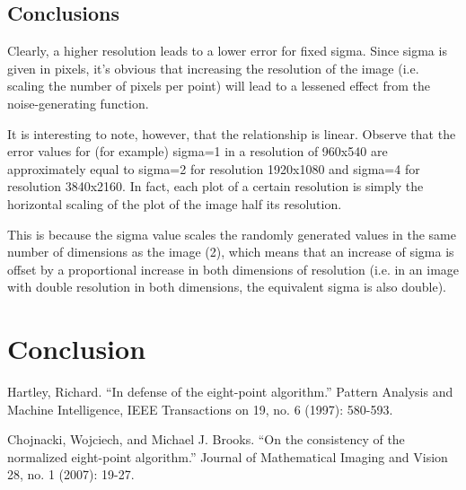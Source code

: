 \documentclass{article}
\begin{document}
\subsection{Conclusions}


Clearly, a higher resolution leads to a lower error for fixed sigma. Since sigma is given in pixels, it's obvious that increasing the resolution of the image (i.e. scaling the number of pixels per point) will lead to a lessened effect from the noise-generating function.



It is interesting to note, however, that the relationship is linear. Observe that the error values for (for example) sigma=1 in a resolution of 960x540 are approximately equal to sigma=2 for resolution 1920x1080 and sigma=4 for resolution 3840x2160. In fact, each plot of a certain resolution is simply the horizontal scaling of the plot of the image half its resolution. 


This is because the sigma value scales the randomly generated values in the same number of dimensions as the image (2), which means that an increase of sigma is offset by a proportional increase in both dimensions of resolution (i.e. in an image with double resolution in both dimensions, the equivalent sigma is also double).



\section{Conclusion}



\begin{thebibliography}{99}
	Hartley, Richard. ``In defense of the eight-point algorithm.'' Pattern Analysis and Machine Intelligence, IEEE Transactions on 19, no. 6 (1997): 580-593.

	Chojnacki, Wojciech, and Michael J. Brooks. ``On the consistency of the normalized eight-point algorithm.'' Journal of Mathematical Imaging and Vision 28, no. 1 (2007): 19-27.
\end{thebibliography}
\end{document}
